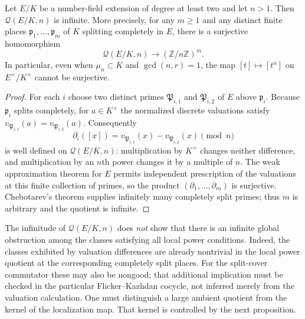 \begin{proposition}
\label{III:prop:global-cokernel}
Let $E/K$ be a number-field extension of degree at least two and
let $n>1$. Then $\mathcal Q(E/K,n)$ is infinite. More precisely,
for any $m\geq 1$ and any distinct finite places
$\mathfrak p_1,\dots,\mathfrak p_m$ of $K$ splitting completely in
$E$, there is a surjective homomorphism
\[
\mathcal Q(E/K,n)\longrightarrow (\mathbb Z/n\mathbb Z)^m.
\]
In particular, even when $\mu_n\subset K$ and $\gcd(n,r)=1$,
the map $[t]\mapsto[t^n]$ on $E^\times/K^\times$ cannot be
surjective.
\end{proposition}
\begin{proof}
For each $i$ choose two distinct primes
$\mathfrak P_{i,1}$ and $\mathfrak P_{i,2}$ of $E$ above
$\mathfrak p_i$. Because $\mathfrak p_i$ splits completely,
for $a\in K^\times$ the normalized discrete valuations satisfy
$v_{\mathfrak P_{i,1}}(a)=v_{\mathfrak P_{i,2}}(a)$.
Consequently
\[
\partial_i([x])=
 v_{\mathfrak P_{i,1}}(x)-v_{\mathfrak P_{i,2}}(x)
 \pmod n
\]
is well defined on $\mathcal Q(E/K,n)$: multiplication by
$K^\times$ changes neither difference, and multiplication by
an $n$th power changes it by a multiple of $n$.
The weak approximation theorem for $E$ permits independent
prescription of the valuations at this finite collection of primes,
so the product $(\partial_1,\dots,\partial_m)$ is surjective.
Chebotarev's theorem supplies infinitely many completely split
primes; thus $m$ is arbitrary and the quotient is infinite.
\end{proof}

\begin{remark}
The infinitude of $\mathcal Q(E/K,n)$ does \emph{not} show that
there is an infinite global obstruction among the classes satisfying
all local power conditions. Indeed, the classes exhibited by valuation
differences are already nontrivial in the local power quotient at
the corresponding completely split places. For the split-cover
commutator these may also be nongood; that additional implication
must be checked in the particular Flicker--Kazhdan cocycle, not
inferred merely from the valuation calculation. One must distinguish
a large ambient quotient from the kernel of the localization map.
That kernel is controlled by the next proposition.
\end{remark}


